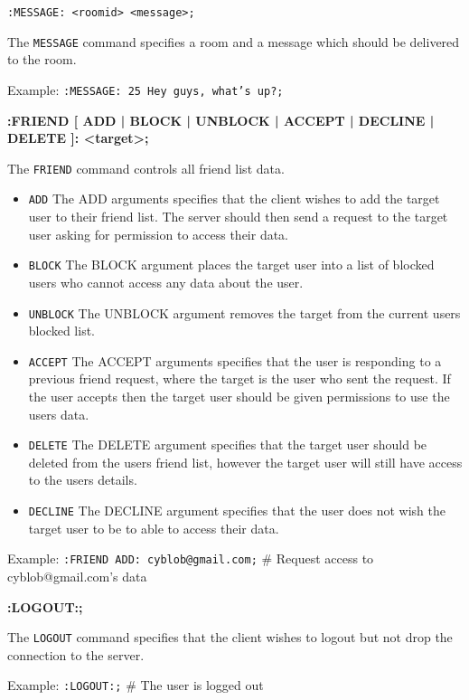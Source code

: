 \texttt{:MESSAGE: <roomid> <message>;}

The \texttt{MESSAGE} command specifies a room and a message which should be delivered to the room.

Example:
\texttt{:MESSAGE: 25 Hey guys, what’s up?;}

{\bf :FRIEND [ ADD | BLOCK | UNBLOCK | ACCEPT | DECLINE | DELETE ]: <target>;}

The \texttt{FRIEND} command controls all friend list data.

\begin{itemize}

\item \texttt{ADD}
The ADD arguments specifies that the client wishes to add the target user to their friend list. The server should then send a request to the target user asking for permission to access their data.

\item \texttt{BLOCK}
The BLOCK argument places the target user into a list of blocked users who cannot access any data about the user.

\item \texttt{UNBLOCK}
The UNBLOCK argument removes the target from the current users blocked list.

\item \texttt{ACCEPT}
The ACCEPT arguments specifies that the user is responding to a previous friend request, where the target is the user who sent the request. If the user accepts then the target user should be given permissions to use the users data.

\item \texttt{DELETE}
The DELETE  argument specifies that the target user should be deleted from the users friend list, however the target user will still have access to the users details.

\item \texttt{DECLINE}
The DECLINE argument specifies that the user does not wish the target user to be to able to access their data. 

\end{itemize}

Example:
\texttt{:FRIEND ADD: cyblob@gmail.com;}	# Request access to cyblob@gmail.com’s data

{\bf :LOGOUT:;}

The \texttt{LOGOUT} command specifies that the client wishes to logout but not drop the connection to the server.

Example:
\texttt{:LOGOUT:;}	# The user is logged out

